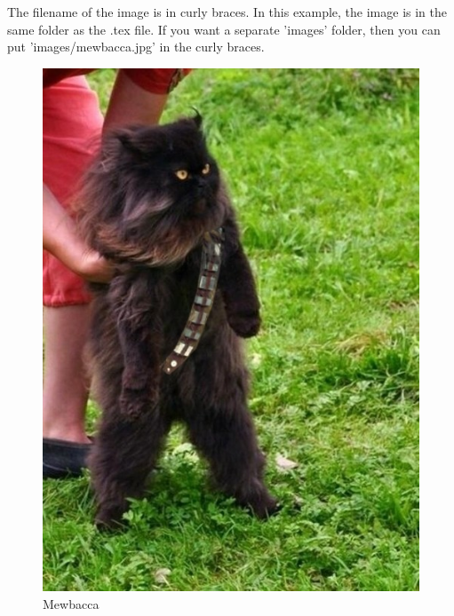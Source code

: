 \documentclass[12pt,a4paper]{article}
\begin{document}
    The filename of the image is in curly braces.  In this example, the
    image is in the same folder as the .tex file.  If you want a
    separate 'images' folder, then you can put 'images/mewbacca.jpg'
    in the curly braces.
    \begin{figure}[ht]
      \centering
      \includegraphics[width=.5\textwidth]{mewbacca.jpg}
      \caption{Mewbacca \label{fig:mewbacca}}
    \end{figure}
\end{document}
